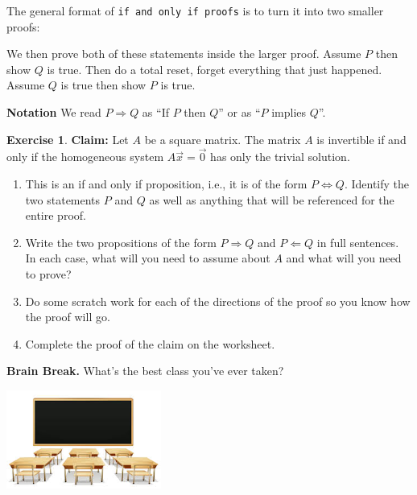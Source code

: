 \documentclass[handout]{beamer}
\newcommand{\vecx}{\vec{x}}
\newcommand{\zerovector}{\vec{0}}
\newcommand{\fn}{\insertframenumber}
\theoremstyle{definition}
\newtheorem{exercise}{Exercise}
\renewcommand{\emph}[1]{{\color{blue}\texttt{#1}}}
\begin{document}
\begin{frame}[fragile]
\frametitle{\fn}
The general format of \emph{if and only if proofs} is to turn it into two smaller proofs:
\begin{center}
\end{center}
We then prove both of these statements inside the larger proof.  Assume $P$ then show $Q$ is true.  Then do a total reset, forget everything that just happened.  Assume $Q$ is true then show $P$ is true.

\begin{block}{\textbf{Notation}}
	We read $P\Rightarrow Q$ as ``If $P$ then $Q$'' or as ``$P$ implies $Q$''.
\end{block}
\end{frame}
\begin{frame}{\fn}
\begin{exercise}\label{triv_sol}
	\textbf{Claim:} Let $A$ be a square matrix. The matrix $A$ is invertible if and only if the homogeneous system $A\vecx=\zerovector$ has only the trivial solution.
	
	\begin{enumerate}[label=(\alph*)]
		\item This is an if and only if proposition, i.e., it is of the form $P\Leftrightarrow Q$.  Identify the two statements $P$ and $Q$ as well as anything that will be referenced for the entire proof.
		\item Write the two propositions of the form $P\Rightarrow Q$ and $P\Leftarrow Q$ in full sentences.  In each case, what will you need to assume about $A$ and what will you need to prove?
		\item Do some scratch work for each of the directions of the proof so you know how the proof will go.
		\item Complete the proof of the claim on the worksheet.
	\end{enumerate}
\end{exercise}
\end{frame}

\begin{frame}{\fn}
	\begin{block}{\textbf{Brain Break.}}
		What’s the best class you’ve ever taken?
		\begin{center}
			\includegraphics[width=2in]{../images/class}
		\end{center}
	\end{block}
\end{frame}
\end{document}
